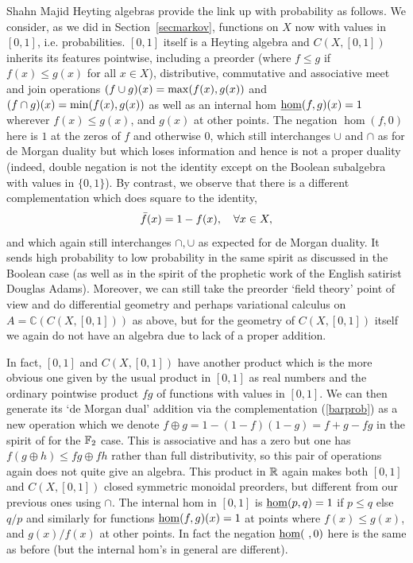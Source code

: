 \begin{artengenv}{Shahn Majid}
Heyting algebras provide the link up with probability as follows. We consider, as we did in Section~\ref{secmarkov}, functions on $X$ now with values in $[0,1]$, i.e. probabilities. $[0, 1]$ itself is a Heyting algebra and $C(X,[0,1])$ inherits its features pointwise, including a preorder (where $f\le g$ if $f(x)\le g(x)$ for all $x\in X$), distributive, commutative and associative meet and join operations $(f\cup g)(x)={\rm max}(f(x),g(x))$ and $(f\cap g)(x)={\rm min}(f(x),g(x))$ as well as an internal hom ${\underline{\rm hom}}(f,g)(x)=1$ wherever $f(x)\le g(x)$, and $g(x)$ at other points. The negation $\hom(f,0)$ here is $1$ at the zeros of $f$ and otherwise $0$, which still interchanges $\cup$ and $\cap$ as for de Morgan duality but which loses information and hence is not a proper duality (indeed, double negation is not the identity except on the Boolean subalgebra with values in $\{0,1\}$). By contrast, we observe that there is a different complementation which does square to the identity, 
\begin{equation}\label{barprob} \Bar f(x)=1-f(x),\quad\forall x\in X,\end{equation}
and which again still interchanges $\cap,\cup$ as expected for de Morgan duality. It sends high probability to low probability in the same spirit as discussed in the Boolean case (as well as in the spirit of the prophetic work of the English satirist Douglas Adams). Moreover, we can still take the preorder `field theory' point of view and do differential geometry and perhaps variational calculus on $A=\mathbb{C}(C(X,[0,1]))$ as above, but for the geometry of $C(X,[0,1])$ itself we again do not have an algebra due to lack of a proper addition. 

In fact, $[0,1]$ and $C(X,[0,1])$ have another product which is the more obvious one given by the usual product in $[0,1]$ as real numbers and the ordinary pointwise product $fg$ of functions with values in $[0,1]$. We can then generate its `de Morgan dual' addition via the complementation (\ref{barprob}) as a new operation which we denote $f\oplus g=1-(1-f)(1-g)=f+g -fg$ in the spirit of \parencite{Ma:boo} for the ${\mathbb{F}}_2$ case. This is associative and has a zero but one has $f(g\oplus h)\le fg\oplus fh$ rather than full distributivity, so this pair of operations again does not quite give an algebra. 
This product in ${\mathbb{R}}$ again makes both $[0,1]$ and $C(X,[0,1])$ closed symmetric monoidal preorders, but different from our previous ones using $\cap$. The internal hom in $[0,1]$ is ${\underline{\rm hom}}(p,q)=1$ if $p\le q$ else $q/p$ and similarly for functions ${\underline{\rm hom}}(f,g)(x)=1$ at points where $f(x)\le g(x)$, and $g(x)/f(x)$ at other points. In fact the negation ${\underline{\rm hom}}(\ ,0)$ here is the same as before (but the internal hom's in general are different). 


\end{artengenv}
